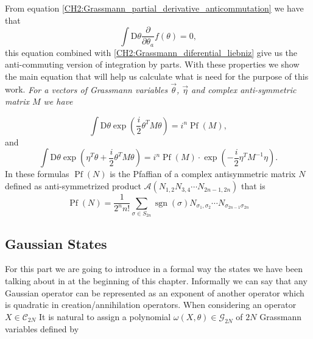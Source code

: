 From equation \eqref{CH2:Grassmann_partial_derivative_anticommutation}  we have that
\begin{equation}
\int \mathrm{D} \theta \frac{\partial}{\partial \theta_{a}} f(\theta)=0,
\end{equation}
this equation combined with \eqref{CH2:Grassmann_diferential_liebniz} give us the anti-commuting version of integration by parts.
\newline
With these properties we show the main equation that will help us calculate what is need for the purpose of this work.
\newline
\textit{For a vectors of Grassmann variables  $\vec{\theta}$, $\vec{\eta}$ and complex anti-symmetric matrix $M$ we have}

\begin{equation}
\int \mathrm{D} \theta \exp \left(\frac{i}{2} \theta^{T} M \theta\right)=i^{n} \operatorname{Pf}(M),
\label{CH2:Grassman_property_1}
\end{equation}
and
\begin{equation}
\int \mathrm{D} \theta \exp \left(\eta^{T} \theta+\frac{i}{2} \theta^{T} M \theta\right)= i^{n} \operatorname{Pf}(M)  \cdot \exp \left(-\frac{i}{2} \eta^{T} M^{-1} \eta\right).
\label{CH2:Grassman_property_2}
\end{equation}
In these formulas $\operatorname{Pf}(N)$ is the Pfaffian of a complex antisymmetric matrix $N$ defined as  anti-symmetrized product $\mathcal{A}(N_{1,2}N_{3,4}\cdots N_{2n-1,2n})$ that is
\begin{equation}
\operatorname{Pf}(N)=\frac{1}{2^{n} n !} \sum_{\sigma \in S_{2 n}} \operatorname{sgn}(\sigma) N_{\sigma_{1}, \sigma_{2}} \cdots N_{\sigma_{2 n-1} \sigma_{2 n}}
\label{CH2:Grassmann_Pfaffian}
\end{equation}
\subsection{Gaussian States}

For this part we are going to introduce in a formal way the states we have been talking about in at the beginning of this chapter. Informally we can say that any Gaussian operator can be represented as an exponent of another operator which is quadratic in creation/annihilation operators. When considering an operator $X\in\mathcal{C}_{2N}$ It is natural to assign a polynomial $\omega(X,\theta)\in \mathcal{G}_{2N}$ of $2N$ Grassmann variables defined by

